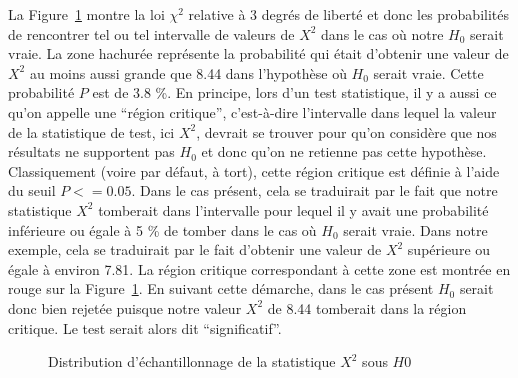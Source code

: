 \documentclass[
  letterpaper,
]{book}
\begin{document}
La Figure~\ref{fig-GOFDistri} montre la loi \(\chi^2\) relative à 3
degrés de liberté et donc les probabilités de rencontrer tel ou tel
intervalle de valeurs de \(X^2\) dans le cas où notre \(H_{0}\) serait
vraie. La zone hachurée représente la probabilité qui était d'obtenir
une valeur de \(X^2\) au moins aussi grande que 8.44 dans l'hypothèse où
\(H_{0}\) serait vraie. Cette probabilité \(P\) est de 3.8 \%. En
principe, lors d'un test statistique, il y a aussi ce qu'on appelle une
``région critique'', c'est-à-dire l'intervalle dans lequel la valeur de
la statistique de test, ici \(X^2\), devrait se trouver pour qu'on
considère que nos résultats ne supportent pas \(H_{0}\) et donc qu'on ne
retienne pas cette hypothèse. Classiquement (voire par défaut, à tort),
cette région critique est définie à l'aide du seuil \(P <= 0.05\). Dans
le cas présent, cela se traduirait par le fait que notre statistique
\(X^2\) tomberait dans l'intervalle pour lequel il y avait une
probabilité inférieure ou égale à 5 \% de tomber dans le cas où
\(H_{0}\) serait vraie. Dans notre exemple, cela se traduirait par le
fait d'obtenir une valeur de \(X^2\) supérieure ou égale à environ 7.81.
La région critique correspondant à cette zone est montrée en rouge sur
la Figure~\ref{fig-GOFDistri}. En suivant cette démarche, dans le cas
présent \(H_{0}\) serait donc bien rejetée puisque notre valeur \(X^2\)
de 8.44 tomberait dans la région critique. Le test serait alors dit
``significatif''.

\begin{figure}


\caption{\label{fig-GOFDistri}Distribution d'échantillonnage de la
statistique \(X^2\) sous \(H{0}\)}

\end{figure}%
\end{document}
